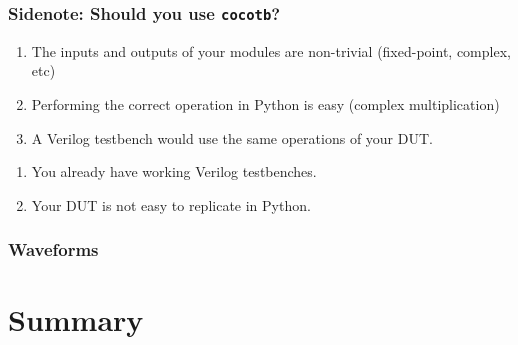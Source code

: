 \documentclass{beamer}
\begin{document}
\begin{frame}
	\frametitle{Sidenote: Should you use \texttt{cocotb}?}
	\begin{enumerate}
		\item The inputs and outputs of your modules are non-trivial (fixed-point, complex, etc)
		\item Performing the correct operation in Python is easy (complex multiplication)
		\item A Verilog testbench would use the same operations of your DUT.
	\end{enumerate}

	\begin{enumerate}
		\item You already have working Verilog testbenches.
		\item Your DUT is not easy to replicate in Python.
	\end{enumerate}

\end{frame}

\begin{frame}
	\frametitle{Waveforms}
\end{frame}

\section{Summary}
\end{document}
